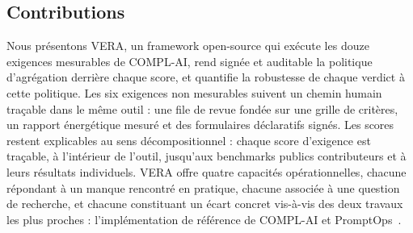\documentclass[10pt,conference]{IEEEtran}
\begin{document}
\subsection{Contributions}
Nous présentons VERA, un framework open-source qui exécute les douze exigences mesurables de COMPL-AI, rend signée et auditable la politique d'agrégation derrière chaque score, et quantifie la robustesse de chaque verdict à cette politique.
Les six exigences non mesurables suivent un chemin humain traçable dans le même outil : une file de revue fondée sur une grille de critères, un rapport énergétique mesuré et des formulaires déclaratifs signés.
Les scores restent explicables au sens décompositionnel : chaque score d'exigence est traçable, à l'intérieur de l'outil, jusqu'aux benchmarks publics contributeurs et à leurs résultats individuels.
VERA offre quatre capacités opérationnelles, chacune répondant à un manque rencontré en pratique, chacune associée à une question de recherche, et chacune constituant un écart concret vis-à-vis des deux travaux les plus proches : l'implémentation de référence de COMPL-AI et PromptOps~\cite{sunetnanta2025promptops}.
\end{document}
